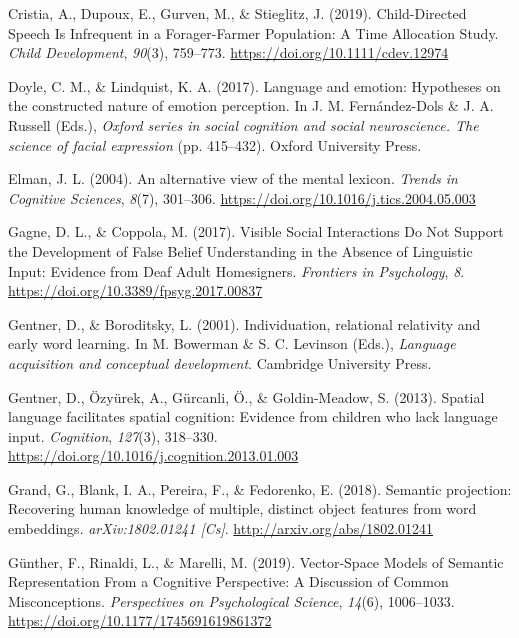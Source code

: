 \documentclass[11pt,man]{article}
\newlength{\cslhangindent}
\newenvironment{cslreferences}%
  {\setlength{\parindent}{0pt}%
  \everypar{\setlength{\hangindent}{\cslhangindent}}\ignorespaces}%
  {\par}
\begin{document}
\begin{cslreferences}
\leavevmode\hypertarget{ref-cristia_child-directed_2019}{}%
Cristia, A., Dupoux, E., Gurven, M., \& Stieglitz, J. (2019).
Child-Directed Speech Is Infrequent in a Forager-Farmer Population: A
Time Allocation Study. \emph{Child Development}, \emph{90}(3), 759--773.
\url{https://doi.org/10.1111/cdev.12974}

\leavevmode\hypertarget{ref-doyle_language_2017}{}%
Doyle, C. M., \& Lindquist, K. A. (2017). Language and emotion:
Hypotheses on the constructed nature of emotion perception. In J. M.
Fernández-Dols \& J. A. Russell (Eds.), \emph{Oxford series in social
cognition and social neuroscience. The science of facial expression}
(pp. 415--432). Oxford University Press.

\leavevmode\hypertarget{ref-elman_alternative_2004}{}%
Elman, J. L. (2004). An alternative view of the mental lexicon.
\emph{Trends in Cognitive Sciences}, \emph{8}(7), 301--306.
\url{https://doi.org/10.1016/j.tics.2004.05.003}

\leavevmode\hypertarget{ref-gagne_visible_2017}{}%
Gagne, D. L., \& Coppola, M. (2017). Visible Social Interactions Do Not
Support the Development of False Belief Understanding in the Absence of
Linguistic Input: Evidence from Deaf Adult Homesigners. \emph{Frontiers
in Psychology}, \emph{8}. \url{https://doi.org/10.3389/fpsyg.2017.00837}

\leavevmode\hypertarget{ref-gentner_individuation_2001}{}%
Gentner, D., \& Boroditsky, L. (2001). Individuation, relational
relativity and early word learning. In M. Bowerman \& S. C. Levinson
(Eds.), \emph{Language acquisition and conceptual development}.
Cambridge University Press.

\leavevmode\hypertarget{ref-gentner_spatial_2013-1}{}%
Gentner, D., Özyürek, A., Gürcanli, Ö., \& Goldin-Meadow, S. (2013).
Spatial language facilitates spatial cognition: Evidence from children
who lack language input. \emph{Cognition}, \emph{127}(3), 318--330.
\url{https://doi.org/10.1016/j.cognition.2013.01.003}

\leavevmode\hypertarget{ref-grand_semantic_2018}{}%
Grand, G., Blank, I. A., Pereira, F., \& Fedorenko, E. (2018). Semantic
projection: Recovering human knowledge of multiple, distinct object
features from word embeddings. \emph{arXiv:1802.01241 {[}Cs{]}}.
\url{http://arxiv.org/abs/1802.01241}

\leavevmode\hypertarget{ref-gunther_vector-space_2019}{}%
Günther, F., Rinaldi, L., \& Marelli, M. (2019). Vector-Space Models of
Semantic Representation From a Cognitive Perspective: A Discussion of
Common Misconceptions. \emph{Perspectives on Psychological Science},
\emph{14}(6), 1006--1033. \url{https://doi.org/10.1177/1745691619861372}


\end{cslreferences}
\end{document}

